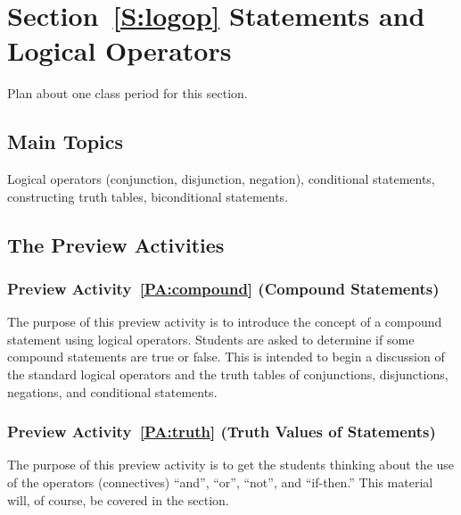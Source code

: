 \section*{Section~\ref{S:logop} Statements and Logical Operators}
Plan about one class period for this section.


\subsection*{Main Topics}
Logical operators (conjunction, disjunction, negation), conditional statements, constructing truth tables, biconditional statements.

\subsection*{The Preview Activities}
\subsubsection*{Preview Activity~\ref{PA:compound} (Compound Statements)} 
The purpose of this preview activity is to introduce the concept of a compound statement using logical operators.  Students are asked to determine if some compound statements are true or false.  This is intended to begin a discussion of the standard logical operators and the truth tables of conjunctions, disjunctions, negations, and conditional statements.

\subsubsection*{Preview Activity~\ref{PA:truth} (Truth Values of Statements)} 
The purpose of this preview activity is to get the students thinking about the use of the operators (connectives) ``and'', ``or'', ``not'', and ``if-then.''  This material will, of course, be covered in the section.

\hbreak



